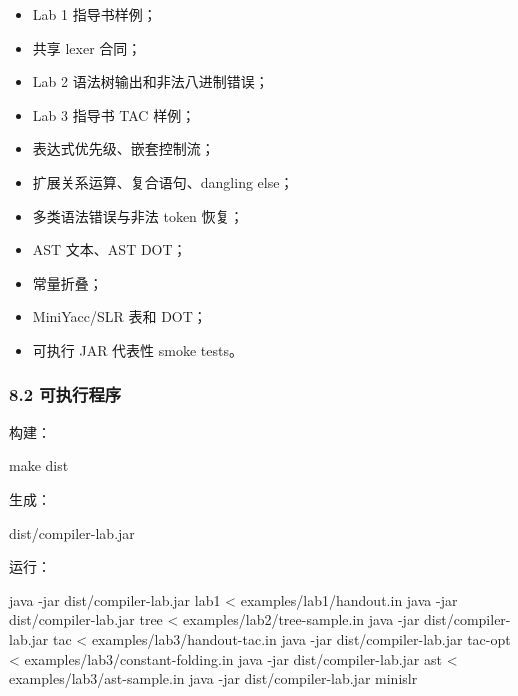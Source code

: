 \documentclass[
  a4paper,
  fontset=none,
]{ctexart}
\newenvironment{Shaded}{}{}
\newcommand{\AttributeTok}[1]{\textcolor[rgb]{0.49,0.56,0.16}{#1}}
\newcommand{\ExtensionTok}[1]{#1}
\newcommand{\FunctionTok}[1]{\textcolor[rgb]{0.02,0.16,0.49}{#1}}
\newcommand{\NormalTok}[1]{#1}
\newcommand{\OperatorTok}[1]{\textcolor[rgb]{0.40,0.40,0.40}{#1}}
\providecommand{\tightlist}{%
  \setlength{\itemsep}{0pt}\setlength{\parskip}{0pt}}
\begin{document}
\begin{itemize}
\tightlist
\item
  Lab 1 指导书样例；
\item
  共享 lexer 合同；
\item
  Lab 2 语法树输出和非法八进制错误；
\item
  Lab 3 指导书 TAC 样例；
\item
  表达式优先级、嵌套控制流；
\item
  扩展关系运算、复合语句、dangling else；
\item
  多类语法错误与非法 token 恢复；
\item
  AST 文本、AST DOT；
\item
  常量折叠；
\item
  MiniYacc/SLR 表和 DOT；
\item
  可执行 JAR 代表性 smoke tests。
\end{itemize}

\hypertarget{ux53efux6267ux884cux7a0bux5e8f}{%
\subsubsection{8.2 可执行程序}\label{ux53efux6267ux884cux7a0bux5e8f}}

构建：

\begin{Shaded}
\begin{Highlighting}[]
\FunctionTok{make}\NormalTok{ dist}
\end{Highlighting}
\end{Shaded}

生成：

\begin{Shaded}
\begin{Highlighting}[]
\NormalTok{dist/compiler{-}lab.jar}
\end{Highlighting}
\end{Shaded}

运行：

\begin{Shaded}
\begin{Highlighting}[]
\ExtensionTok{java} \AttributeTok{{-}jar}\NormalTok{ dist/compiler{-}lab.jar lab1 }\OperatorTok{\textless{}}\NormalTok{ examples/lab1/handout.in}
\ExtensionTok{java} \AttributeTok{{-}jar}\NormalTok{ dist/compiler{-}lab.jar tree }\OperatorTok{\textless{}}\NormalTok{ examples/lab2/tree{-}sample.in}
\ExtensionTok{java} \AttributeTok{{-}jar}\NormalTok{ dist/compiler{-}lab.jar tac }\OperatorTok{\textless{}}\NormalTok{ examples/lab3/handout{-}tac.in}
\ExtensionTok{java} \AttributeTok{{-}jar}\NormalTok{ dist/compiler{-}lab.jar tac{-}opt }\OperatorTok{\textless{}}\NormalTok{ examples/lab3/constant{-}folding.in}
\ExtensionTok{java} \AttributeTok{{-}jar}\NormalTok{ dist/compiler{-}lab.jar ast }\OperatorTok{\textless{}}\NormalTok{ examples/lab3/ast{-}sample.in}
\ExtensionTok{java} \AttributeTok{{-}jar}\NormalTok{ dist/compiler{-}lab.jar minislr}
\end{Highlighting}
\end{Shaded}
\end{document}
